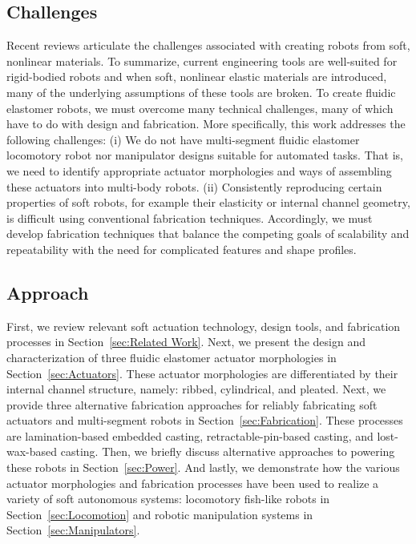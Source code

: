 \subsection{Challenges}
Recent reviews \citep{trivedi2008soft, trimmer2014journal, lipson2014challenges, majidi2014soft} articulate the challenges associated with creating robots from soft, nonlinear materials.
%
To summarize, current engineering tools are well-suited for rigid-bodied robots and when soft, nonlinear elastic materials are introduced, many of the underlying assumptions of these tools are broken.
%
To create fluidic elastomer robots, we must overcome many technical challenges, many of which have to do with design and fabrication.
%
More specifically, this work addresses the following challenges:
(i) We do not have multi-segment fluidic elastomer locomotory robot nor manipulator designs suitable for automated tasks.
That is, we need to identify appropriate actuator morphologies and ways of assembling these actuators into multi-body robots.
(ii) Consistently reproducing certain properties of soft robots, for example their elasticity or internal channel geometry, is difficult using conventional fabrication techniques.
Accordingly, we must develop fabrication techniques that balance the competing goals of scalability and repeatability with the need for complicated features and shape profiles.

\subsection{Approach}
First, we review relevant soft actuation technology, design tools, and fabrication processes in Section~\ref{sec:Related Work}.
%
Next, we present the design and characterization of three fluidic elastomer actuator morphologies in Section~\ref{sec:Actuators}.
%
These actuator morphologies are differentiated by their internal channel structure, namely: ribbed, cylindrical, and pleated.
%
Next, we provide three alternative fabrication approaches for reliably fabricating soft actuators and multi-segment robots in Section~\ref{sec:Fabrication}.
%
These processes are lamination-based embedded casting, retractable-pin-based casting, and lost-wax-based casting.
%
Then, we briefly discuss alternative approaches to powering these robots in Section~\ref{sec:Power}.
%
And lastly, we demonstrate how the various actuator morphologies and fabrication processes have been used to realize a variety of soft autonomous systems: locomotory fish-like robots in Section~\ref{sec:Locomotion} and robotic manipulation systems in Section~\ref{sec:Manipulators}.

